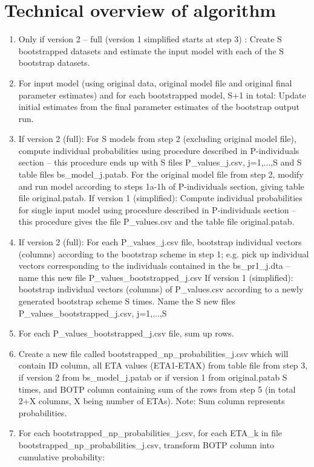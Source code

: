 \section{Technical overview of algorithm}
\begin{enumerate}
\item Only if version 2 – full (version 1 simplified starts at step 3) : Create S bootstrapped datasets and estimate the input model with each of the S bootstrap datasets. 
\item For input model (using original data, original model file and original final parameter estimates) and for each bootstrapped model, S+1 in total: Update initial estimates from the final parameter estimates of the bootstrap output run. 
\item If version 2 (full): For S models from step 2 (excluding original model file), compute individual probabilities using procedure described in P-individuals section – this procedure ends up with S files P\_values\_j.csv, j=1,...,S and S table files bs\_model\_j.patab. For the original model file from step 2, modify and run model according to steps 1a-1h of P-individuals section, giving table file original.patab.
	If version 1 (simplified): Compute individual probabilities for single input model using 	procedure described in P-individuals section – this procedure gives the file P\_values.csv and the 	table file original.patab.
\item If version 2 (full): For each P\_values\_j.csv file, bootstrap individual vectors (columns) according to the bootstrap scheme in step 1; e.g. pick up individual vectors corresponding to the individuals contained in the bs\_pr1\_j.dta – name this new file P\_values\_bootstrapped\_j.csv
	If version 1 (simplified): bootstrap individual vectors (columns) of P\_values.csv according to a 	newly generated bootstrap scheme S times. Name the S new files P\_values\_bootstrapped\_j.csv, 	j=1,...,S
\item For each P\_values\_bootstrapped\_j.csv file, sum up rows.
\item Create a new file called bootstrapped\_np\_probabilities\_j.csv which will contain ID column, all ETA values (ETA1-ETAX) from table file from step 3, if version 2 from bs\_model\_j.patab or if version 1 from original.patab S times, and BOTP column containing sum of the rows from step 5 (in total 2+X columns, X being number of ETAs). Note: Sum column represents probabilities.
\item For each bootstrapped\_np\_probabilities\_j.csv, for each ETA\_k in file bootstrapped\_np\_probabilities\_j.csv, transform BOTP column into cumulative probability:

\end{enumerate}
